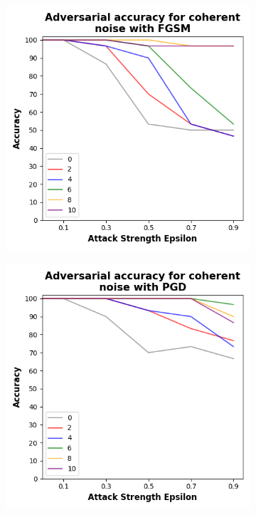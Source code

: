 \begin{figure}[!h]
  \begin{subfigure}{0.45\textwidth}
      \includegraphics[width=\linewidth]{figures/evaluation_results/iris/pqc/figures/coherent-fgsm.png}
      \label{fig:iris9}
  \end{subfigure} \qquad
  \begin{subfigure}{0.45\textwidth}
      \includegraphics[width=\linewidth]{figures/evaluation_results/iris/pqc/figures/coherent-pgd.png}
      \label{fig:iris10}
  \end{subfigure}


\end{figure}
